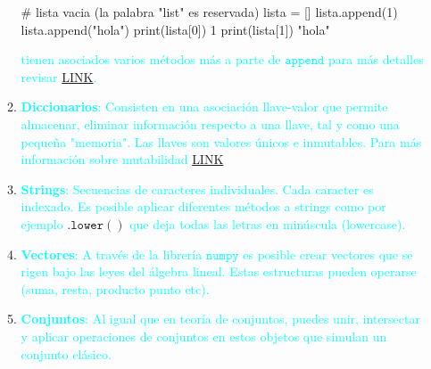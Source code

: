 \documentclass{exam}
\theoremstyle{definition}
\begin{document}
\begin{enumerate}
\begin{enumerate}
\begin{python}
        # lista vacia (la palabra "list" es reservada)
        lista = []
        lista.append(1)
        lista.append("hola")
        print(lista[0])
        1
        print(lista[1])
        "hola"
    \end{python}
    \textcolor{cyan}{
    tienen asociados varios métodos más a parte de $\mathtt{append}$ para más detalles revisar \href{https://docs.python.org/3/tutorial/datastructures.html}{LINK}. }\textcolor{black}{}
    \item \textcolor{cyan}{\textbf{Diccionarios}: Consisten en una asociación llave-valor que permite almacenar, eliminar información respecto a una llave, tal y como una pequeña "memoria". Las llaves son valores únicos e inmutables. Para más información sobre mutabilidad} \href{https://realpython.com/python-mutable-vs-immutable-types/#:~:text=Python%20has%20both%20mutable%20and,you%20as%20a%20Python%20developer.}{LINK}
    \item \textcolor{cyan}{\textbf{Strings}: Secuencias de caracteres individuales. Cada caracter es indexado. Es posible aplicar diferentes métodos a strings como por ejemplo} $\mathtt{.lower()}$ \textcolor{cyan}{que deja todas las letras en minúscula (lowercase).}
    \item \textcolor{cyan}{\textbf{Vectores}: A través de la librería $\mathtt{numpy}$ es posible crear vectores que se rigen bajo las leyes del álgebra lineal. Estas estructuras pueden operarse (suma, resta, producto punto etc). }
    \item \textcolor{cyan}{\textbf{Conjuntos}: Al igual que en teoría de conjuntos, puedes unir, intersectar y aplicar operaciones de conjuntos en estos objetos que simulan un conjunto clásico.} 
    \end{enumerate}
\end{enumerate}
\end{document}
